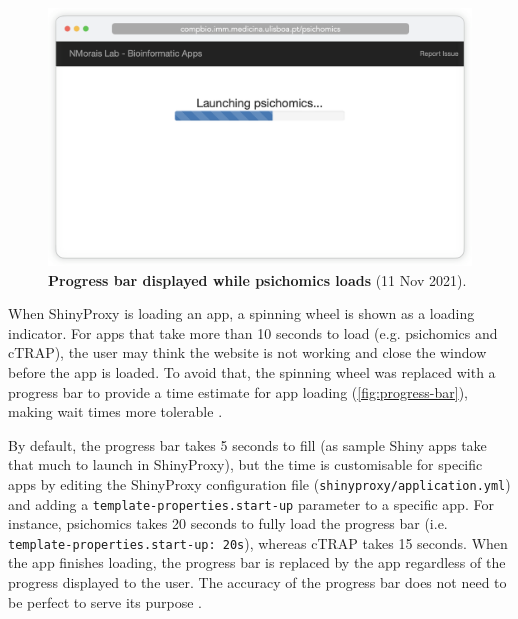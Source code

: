 \begin{figure}
  \vspace{-\intextsep}
  \includegraphics[width=\linewidth]{images/app-server/progress-bar}
  \caption[Screenshot of app loading]{\textbf{Progress bar displayed while psichomics loads} (11 Nov 2021).}
  \label{fig:progress-bar}
  \vspace{-\intextsep}
\end{figure}


When ShinyProxy is loading an app, a spinning wheel is shown as a loading indicator. For apps that take more than 10 seconds to load (e.g. psichomics and cTRAP), the user may think the website is not working and close the window before the app is loaded. To avoid that, the spinning wheel was replaced with a progress bar to provide a time estimate for app loading (\autoref{fig:progress-bar}), making wait times more tolerable \cite{myers:1985us,yablonski:2020ts}.

By default, the progress bar takes 5 seconds to fill (as sample Shiny apps take that much to launch in ShinyProxy), but the time is customisable for specific apps by editing the ShinyProxy configuration file (\texttt{shinyproxy/application.yml}) and adding a \texttt{template-properties.start-up} parameter to a specific app. For instance, psichomics takes 20 seconds to fully load the progress bar (i.e. \texttt{template-properties.start-up: 20s}), whereas cTRAP takes 15 seconds. When the app finishes loading, the progress bar is replaced by the app regardless of the progress displayed to the user. The accuracy of the progress bar does not need to be perfect to serve its purpose \cite{myers:1985us,yablonski:2020ts}.

